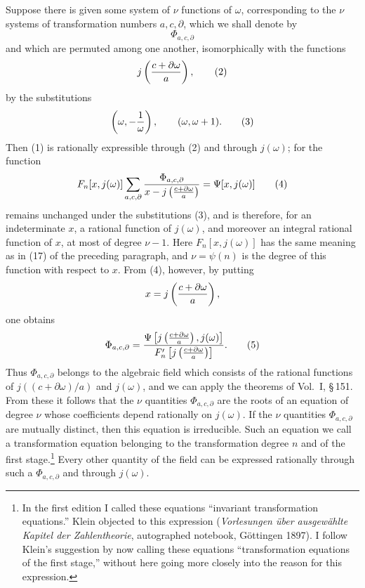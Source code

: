 \documentclass[11pt]{article}
\begin{document}
Suppose there is given some system of $\nu$ functions of $\omega$, corresponding to the $\nu$ systems of transformation numbers $a,c,\partial$, which we shall denote by
\begin{equation}
\Phi_{a,c,\partial}
\tag{1}
\end{equation}
and which are permuted among one another, isomorphically with the functions
\begin{equation}
 j\left({c+\partial\omega\over a}\right),
\tag{2}
\end{equation}
by the substitutions
\begin{equation}
\left(\omega,-{1\over\omega}\right),\qquad (\omega,\omega+1).
\tag{3}
\end{equation}
Then (1) is rationally expressible through (2) and through $j(\omega)$; for the function
\begin{equation}
 F_n[x,j(\omega)]\sum_{a,c,\partial}{\Phi_{a,c,\partial}\over x-j\left({c+\partial\omega\over a}\right)}=\Psi[x,j(\omega)]
\tag{4}
\end{equation}
remains unchanged under the substitutions (3), and is therefore, for an indeterminate $x$, a rational function of $j(\omega)$, and moreover an integral rational function of $x$, at most of degree $\nu-1$. Here $F_n[x,j(\omega)]$ has the same meaning as in (17) of the preceding paragraph, and $\nu=\psi(n)$ is the degree of this function with respect to $x$. From (4), however, by putting
\[
 x=j\left({c+\partial\omega\over a}\right),
\]
one obtains
\begin{equation}
 \Phi_{a,c,\partial}={\Psi\left[j\left({c+\partial\omega\over a}\right),j(\omega)\right]
 \over F'_n\left[j\left({c+\partial\omega\over a}\right)\right]}.
\tag{5}
\end{equation}
Thus $\Phi_{a,c,\partial}$ belongs to the algebraic field which consists of the rational functions of $j((c+\partial\omega)/a)$ and $j(\omega)$, and we can apply the theorems of Vol.~I, \S\,151. From these it follows that the $\nu$ quantities $\Phi_{a,c,\partial}$ are the roots of an equation of degree $\nu$ whose coefficients depend rationally on $j(\omega)$. If the $\nu$ quantities $\Phi_{a,c,\partial}$ are mutually distinct, then this equation is irreducible. Such an equation we call a transformation equation belonging to the transformation degree $n$ and of the first stage.\footnote{In the first edition I called these equations ``invariant transformation equations.'' Klein objected to this expression (\emph{Vorlesungen über ausgewählte Kapitel der Zahlentheorie}, autographed notebook, Göttingen 1897). I follow Klein's suggestion by now calling these equations ``transformation equations of the first stage,'' without here going more closely into the reason for this expression.} Every other quantity of the field can be expressed rationally through such a $\Phi_{a,c,\partial}$ and through $j(\omega)$.
\end{document}
